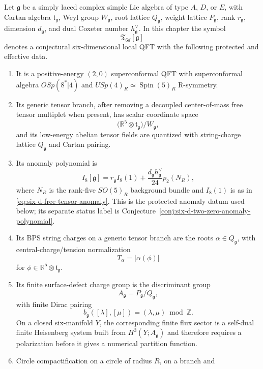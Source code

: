 \begin{conjecture}
\label{conj:six-d-two-zero-ade-fixed-point}
Let \(\mathfrak g\) be a simply laced complex simple Lie algebra of type
\(A\), \(D\), or \(E\), with Cartan algebra
\(\mathfrak t_{\mathfrak g}\), Weyl group \(W_{\mathfrak g}\), root lattice
\(Q_{\mathfrak g}\), weight lattice \(P_{\mathfrak g}\), rank
\(r_{\mathfrak g}\), dimension \(d_{\mathfrak g}\), and dual Coxeter number
\(h^\vee_{\mathfrak g}\).  In this chapter the symbol
\[
  \mathfrak T_{6d}[\mathfrak g]
\]
denotes a conjectural six-dimensional local QFT with the following protected
and effective data.
\begin{enumerate}[label=\textup{(\roman*)}]
\item It is a positive-energy \((2,0)\) superconformal QFT with
superconformal algebra \(OSp(8^\ast|4)\) and \(USp(4)_R\simeq
\operatorname{Spin}(5)_R\) R-symmetry.
\item Its generic tensor branch, after removing a decoupled center-of-mass
free tensor multiplet when present, has scalar coordinate space
\[
  \bigl(\mathbb R^5\otimes\mathfrak t_{\mathfrak g}\bigr)/W_{\mathfrak g},
\]
and its low-energy abelian tensor fields are quantized with string-charge
lattice \(Q_{\mathfrak g}\) and Cartan pairing.
\item Its anomaly polynomial is
\[
  I_8[\mathfrak g]
  =
  r_{\mathfrak g}I_8(1)
  +
  \frac{d_{\mathfrak g}h^\vee_{\mathfrak g}}{24}p_2(N_R),
\]
where \(N_R\) is the rank-five \(SO(5)_R\) background bundle and
\(I_8(1)\) is as in
\eqref{eq:six-d-free-tensor-anomaly}.  This is the protected anomaly datum
used below; its separate status label is
Conjecture~\ref{conj:six-d-two-zero-anomaly-polynomial}.
\item Its BPS string charges on a generic tensor branch are the roots
\(\alpha\in Q_{\mathfrak g}\), with central-charge/tension normalization
\[
  T_\alpha=|\alpha(\phi)|
\]
for \(\phi\in\mathbb R^5\otimes\mathfrak t_{\mathfrak g}\).
\item Its finite surface-defect charge group is the discriminant group
\[
  A_{\mathfrak g}=P_{\mathfrak g}/Q_{\mathfrak g},
\]
with finite Dirac pairing
\[
  b_{\mathfrak g}([\lambda],[\mu])
  =
  (\lambda,\mu)\bmod\mathbb Z .
\]
On a closed six-manifold \(Y\), the corresponding finite flux sector is a
self-dual finite Heisenberg system built from \(H^3(Y;A_{\mathfrak g})\) and
therefore requires a polarization before it gives a numerical partition
function.
\item Circle compactification on a circle of radius \(R\), on a branch and

\end{enumerate}
\end{conjecture}
